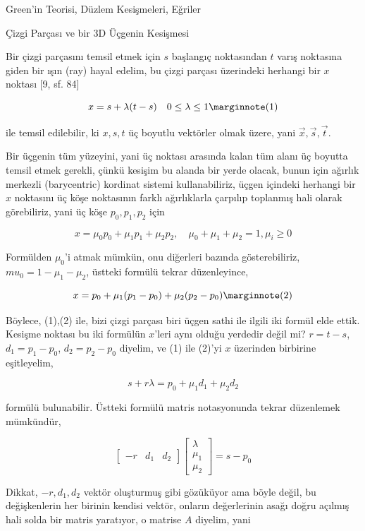 \documentclass[12pt,fleqn]{article}\usepackage{../../common}
\begin{document}
Green'in Teorisi, Düzlem Kesişmeleri, Eğriler

Çizgi Parçası ve bir 3D Üçgenin Kesişmesi

Bir çizgi parçasını temsil etmek için $s$ başlangıç noktasından $t$ varış
noktasına giden bir ışın (ray) hayal edelim, bu çizgi parçası üzerindeki
herhangi bir $x$ noktası [9, sf. 84]

$$
x = s + \lambda (t-s) \quad 0 \le \lambda \le 1
\mlabel{1}
$$

ile temsil edilebilir, ki $x,s,t$ üç boyutlu vektörler olmak üzere, yani
$\vec{x},\vec{s},\vec{t}$.

Bir üçgenin tüm yüzeyini, yani üç noktası arasında kalan tüm alanı üç boyutta
temsil etmek gerekli, çünkü kesişim bu alanda bir yerde olacak, bunun için
ağırlık merkezli (barycentric) kordinat sistemi kullanabiliriz, üçgen içindeki
herhangi bir $x$ noktasını üç köşe noktasının farklı ağırlıklarla çarpılıp
toplanmış hali olarak görebiliriz, yani üç köşe $p_0,p_1,p_2$ için

$$
x = \mu_0 p_0 + \mu_1 p_1 + \mu_2 p_2,
\quad \mu_0 + \mu_1 + \mu_2 = 1, \mu_i \ge 0
$$

Formülden $\mu_0$'i atmak mümkün, onu diğerleri bazında gösterebiliriz,
$mu_0 = 1-\mu_1-\mu_2$, üstteki formülü tekrar düzenleyince,

$$
x = p_0 + \mu_1 (p_1 - p_0) + \mu_2 (p_2 - p_0)
\mlabel{2}
$$

Böylece, (1),(2) ile, bizi çizgi parçası biri üçgen sathi ile ilgili iki
formül elde ettik. Kesişme noktası bu iki formülün $x$'leri aynı olduğu
yerdedir değil mi? $r=t-s$, $d_1=p_1-p_0$, $d_2 = p_2-p_0$ diyelim,
ve (1) ile (2)'yi $x$ üzerinden birbirine eşitleyelim,

$$
s + r\lambda = p_0 + \mu_1 d_1 + \mu_2 d_2
$$

formülü bulunabilir. Üstteki formülü matris notasyonunda tekrar düzenlemek
mümkündür,

$$
[\begin{array}{ccc} -r & d_1 & d_2 \end{array}]
\left[\begin{array}{ccc}
\lambda \\ \mu_1 \\ \mu_2 
\end{array}\right] = s - p_0
$$

Dikkat, $-r,d_1,d_2$ vektör oluşturmuş gibi gözüküyor ama böyle değil, bu
değişkenlerin her birinin kendisi vektör, onların değerlerinin asağı doğru
açılmış hali solda bir matris yaratıyor, o matrise $A$ diyelim, yani
\end{document}
